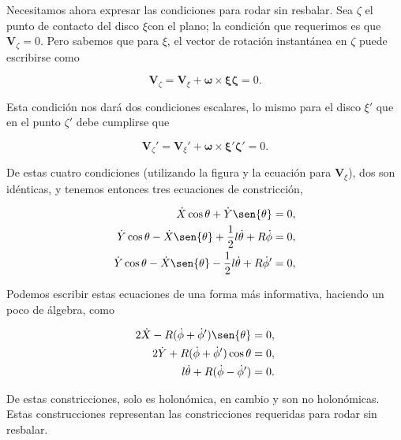 \documentclass[a4paper,10pt]{article}
\numberwithin{equation}{section}
\begin{document}
Necesitamos ahora expresar las condiciones para rodar sin resbalar. Sea 
$\zeta$ el punto de contacto del disco $\xi$con el plano; la condición que 
requerimos es que $\mathbf{V}_\zeta = 0$. Pero sabemos que para $\xi$, 
el vector de rotación instantánea en $\zeta$ puede escribirse como 

\begin{equation}
 \mathbf{V}_\zeta = \mathbf{V}_\xi + \mathbf{\omega}\times \mathbf{\xi\zeta} = 0.
\end{equation}

Esta condición nos dará dos condiciones escalares, lo mismo para 
el disco $\xi'$ que en el punto $\zeta'$ debe cumplirse que 

\begin{equation}
 \mathbf{V}_\zeta' = \mathbf{V}_\xi' + \mathbf{\omega}\times \mathbf{\xi'\zeta'} = 0.
\end{equation}

De estas cuatro condiciones (utilizando la figura  y la ecuación para $\mathbf{V}_\xi$), 
dos son idénticas, y tenemos entonces tres ecuaciones de constricción,

\begin{align}
 \dot{X}\cos{\theta} + \dot{Y}\sen{\theta} = 0, \\
 \dot{Y}\cos{\theta} - \dot{X}\sen{\theta} + \frac{1}{2}l\dot{\theta} + R\dot{\phi} = 0, \\
 \dot{Y}\cos{\theta} - \dot{X}\sen{\theta} - \frac{1}{2}l\dot{\theta} + R\dot{\phi}' = 0,
\end{align}

Podemos escribir estas ecuaciones de una forma más informativa, haciendo 
un poco de álgebra, como

\begin{align}
\label{eq:discosConstri1}
 2\dot{X} - R (\dot{\phi} + \dot{\phi}')\sen{\theta} = 0, \\
\label{eq:discosConstri2}
 2\dot{Y} + R (\dot{\phi} + \dot{\phi}')\cos{\theta} = 0, \\
\label{eq:discosConstri3}
 l\dot{\theta} + R (\dot{\phi} - \dot{\phi}') = 0.
\end{align}

De estas constricciones, solo  es holonómica, 
en cambio  y  son no holonómicas. 
Estas construcciones representan las constricciones requeridas para rodar 
sin resbalar. 

\vspace{.3cm}
\end{document}
